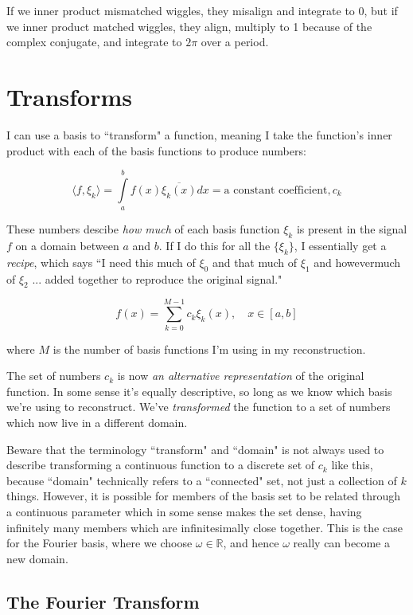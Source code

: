 \documentclass[10pt]{article}
\begin{document}
If we inner product mismatched wiggles, they misalign and integrate to 0, but if we inner product matched wiggles, they align, multiply to 1 because of the complex conjugate, and integrate to $2\pi$ over a period.

\section{Transforms}

I can use a basis to ``transform" a function, meaning I take the function's inner product with each of the basis functions to produce numbers:

$$ \langle f,\xi_k \rangle = \int\limits_{a}^{b} f(x) \overline{\xi_k(x)} dx = \text{a constant coefficient}, c_k $$

These numbers descibe \textit{how much} of each basis function $\xi_k$ is present in the signal $f$ on a domain between $a$ and $b$. If I do this for all the $\{\xi_k\}$, I essentially get a \textit{recipe}, which says ``I need this much of $\xi_0$ and that much of $\xi_1$ and howevermuch of $\xi_2$ ... added together to reproduce the original signal."

$$ f(x) = \sum_{k=0}^{M-1} c_k \xi_k(x), \quad x \in [a, b] $$

where $M$ is the number of basis functions I'm using in my reconstruction.\newline

The set of numbers $c_k$ is now \textit{an alternative representation} of the original function. In some sense it's equally descriptive, so long as we know which basis we're using to reconstruct. We've \textit{transformed} the function to a set of numbers which now live in a different domain.

Beware that the terminology ``transform" and ``domain" is not always used to describe transforming a continuous function to a discrete set of $c_k$ like this, because ``domain" technically refers to a ``connected" set, not just a collection of $k$ things. However, it is possible for members of the basis set to be related through a continuous parameter which in some sense makes the set dense, having infinitely many members which are infinitesimally close together. This is the case for the Fourier basis, where we choose $\omega \in \mathbb{R}$, and hence $\omega$ really can become a new domain.

\subsection{The Fourier Transform}\label{fourierT}
\end{document}
